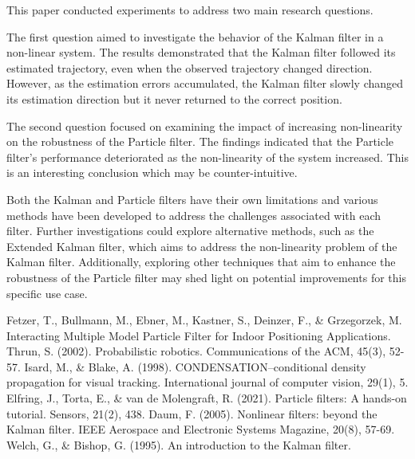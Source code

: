 \documentclass[conference]{IEEEtran}
\begin{document}
This paper conducted experiments to address two main research questions.

The first question aimed to investigate the behavior of the Kalman filter in a non-linear system.
The results demonstrated that the Kalman filter followed its estimated trajectory, even when the observed trajectory changed direction.
However, as the estimation errors accumulated, the Kalman filter slowly changed its estimation direction but it never returned to the correct position.

The second question focused on examining the impact of increasing non-linearity on the robustness of the Particle filter.
The findings indicated that the Particle filter's performance deteriorated as the non-linearity of the system increased.
This is an interesting conclusion which may be counter-intuitive.

Both the Kalman and Particle filters have their own limitations and various methods have been developed to address the challenges associated with each filter.
Further investigations could explore alternative methods, such as the Extended Kalman filter, which aims to address the non-linearity problem of the Kalman filter.
Additionally, exploring other techniques that aim to enhance the robustness of the Particle filter may shed light on potential improvements for this specific use case.

\begin{thebibliography}{00} %
	 Fetzer, T., Bullmann, M., Ebner, M., Kastner, S., Deinzer, F., \& Grzegorzek, M. Interacting Multiple Model Particle Filter for Indoor Positioning Applications.
	 Thrun, S. (2002). Probabilistic robotics. Communications of the ACM, 45(3), 52-57. %
	 Isard, M., \& Blake, A. (1998). CONDENSATION--conditional density propagation for visual tracking. International journal of computer vision, 29(1), 5.
	 Elfring, J., Torta, E., \& van de Molengraft, R. (2021). Particle filters: A hands-on tutorial. Sensors, 21(2), 438.
	 Daum, F. (2005). Nonlinear filters: beyond the Kalman filter. IEEE Aerospace and Electronic Systems Magazine, 20(8), 57-69.
	 Welch, G., \& Bishop, G. (1995). An introduction to the Kalman filter.

\end{thebibliography}
\end{document}
